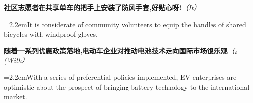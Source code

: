 \documentclass[11pt,a4paper]{article}
\newcommand{\num}[1]{\makebox[1.9em][r]{#1.}\hspace{0.3em}}
\newcommand{\prompt}[1]{\emph{\textcolor{tipblue}{\small（#1）}}}
\begin{document}
\begin{minipage}{\linewidth}

\num{39}\textbf{社区志愿者在共享单车的把手上安装了防风手套,好贴心呀!}\prompt{It}

\vspace{0.15em}

\noindent\hangindent=2.2em\hspace{2.2em}It is considerate of community volunteers to equip the handles of shared bicycles with windproof gloves.

\end{minipage}

\begin{minipage}{\linewidth}

\num{40}\textbf{随着一系列优惠政策落地,电动车企业对推动电池技术走向国际市场很乐观}\prompt{。(With}

\vspace{0.15em}

\noindent\hangindent=2.2em\hspace{2.2em}With a series of preferential policies implemented, EV enterprises are optimistic about the prospect of bringing battery technology to the international market.

\end{minipage}
\end{document}
